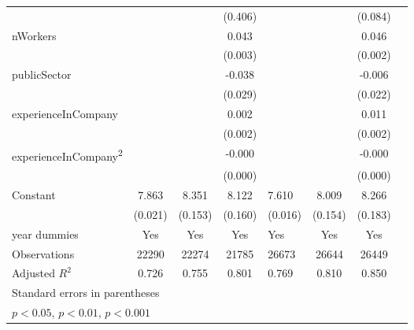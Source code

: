 {\begin{longtable}{l*{3}{c}|l*{3}{c}}
		&                     &                     &     (0.406)         &                     &                     &     (0.084)         \\
		nWorkers            &                     &                     &       0.043\sym{***}&                     &                     &       0.046\sym{***}\\
		&                     &                     &     (0.003)         &                     &                     &     (0.002)         \\
		publicSector      &                     &                     &      -0.038         &                     &                     &      -0.006         \\
		&                     &                     &     (0.029)         &                     &                     &     (0.022)         \\
		experienceInCompany &                     &                     &       0.002         &                     &                     &       0.011\sym{***}\\
		&                     &                     &     (0.002)         &                     &                     &     (0.002)         \\
		experienceInCompany\textsuperscript{2}&                     &                     &      -0.000         &                     &                     &      -0.000\sym{***}\\
		&                     &                     &     (0.000)         &                     &                     &     (0.000)         \\
		Constant            &       7.863\sym{***}&       8.351\sym{***}&       8.122\sym{***}&       7.610\sym{***}&       8.009\sym{***}&       8.266\sym{***}\\
		&     (0.021)         &     (0.153)         &     (0.160)         &     (0.016)         &     (0.154)         &     (0.183)         \\
		year dummies        &         Yes         &         Yes         &         Yes         &         Yes         &         Yes         &         Yes         \\
		\midrule
		Observations        &       22290         &       22274         &       21785         &       26673         &       26644         &       26449         \\
		Adjusted \(R^{2}\)  &       0.726         &       0.755         &       0.801         &       0.769         &       0.810         &       0.850         \\
		\bottomrule
		\multicolumn{7}{l}{\footnotesize Standard errors in parentheses}\\
		\multicolumn{7}{l}{\footnotesize \sym{*} \(p<0.05\), \sym{**} \(p<0.01\), \sym{***} \(p<0.001\)}\\
	\end{longtable}
}
